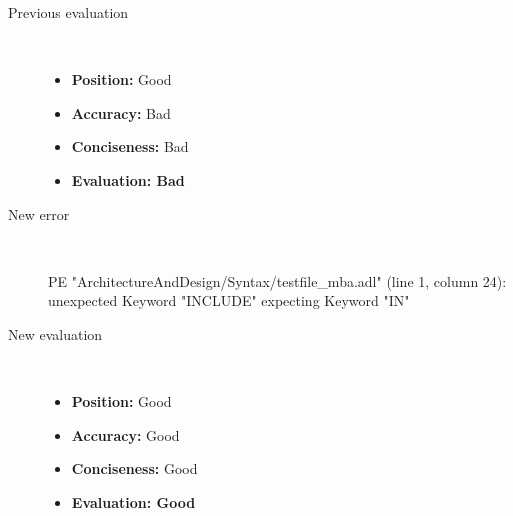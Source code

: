 \begin{description}
\begin{haskell}
\end{haskell}
  \item[Previous evaluation]~\\
    \begin{itemize}
    \item \textbf{Position:} Good
    \item \textbf{Accuracy:} Bad
    \item \textbf{Conciseness:} Bad
    \item \textbf{Evaluation: Bad}
    \end{itemize}
  \item[New error]~\\
\begin{haskell}
PE "ArchitectureAndDesign/Syntax/testfile_mba.adl" (line 1, column 24):
unexpected Keyword "INCLUDE"
expecting Keyword "IN"\end{haskell}
  \item[New evaluation]~\\
    \begin{itemize}
    \item \textbf{Position:} Good
    \item \textbf{Accuracy:} Good
    \item \textbf{Conciseness:} Good
    \item \textbf{Evaluation: Good}
    \end{itemize}
  \end{description}

\hrulefill

